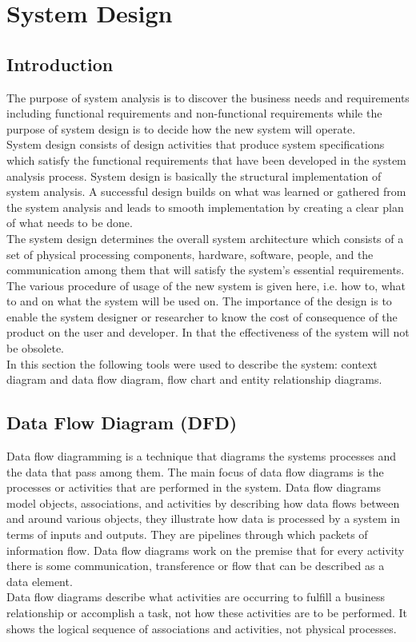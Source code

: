 \documentclass[twoside, a4paper, 12pt]{report}
\begin{document}
\chapter{System Design}
\section{Introduction}
The purpose of system analysis is to discover the business needs and requirements including functional requirements and non-functional requirements while the purpose of system design is to decide how the new system will operate.\\
\indent
System design consists of design activities that produce system specifications which satisfy the functional requirements that have been developed in the system analysis process. System design is basically the structural implementation of system analysis. A successful design builds on what was learned or gathered from the system analysis and leads to smooth implementation by creating a clear plan of what needs to be done.\\
\indent
The system design determines the overall system architecture which consists of a set of physical processing components, hardware, software, people, and the communication among them that will satisfy the system's essential requirements. The various procedure of usage of the new system is given here, i.e. how to, what to and on what the system will be used on. The importance of the design is to enable the system designer or researcher to know the cost of consequence of the product on the user and developer. In that the effectiveness of the system will not be obsolete.\\
\indent
In this section the following tools were used to describe the system: context diagram and data flow diagram, flow chart and entity relationship diagrams.

\section{Data Flow Diagram (DFD)}
Data flow diagramming is a technique that diagrams the systems processes and the data that pass among them. The main focus of data flow diagrams is the processes or activities that are performed in the system. Data flow diagrams model objects, associations, and activities by describing how data flows between and around various objects, they illustrate how data is processed by a system in terms of inputs and outputs. They are pipelines through which packets of information flow. Data flow diagrams work on the premise that for every activity there is some communication, transference or flow that can be described as a data element.\\
\indent
Data flow diagrams describe what activities are occurring to fulfill a business relationship or accomplish a task, not how these activities are to be performed. It shows the logical sequence of associations and activities, not physical processes.
\end{document}
